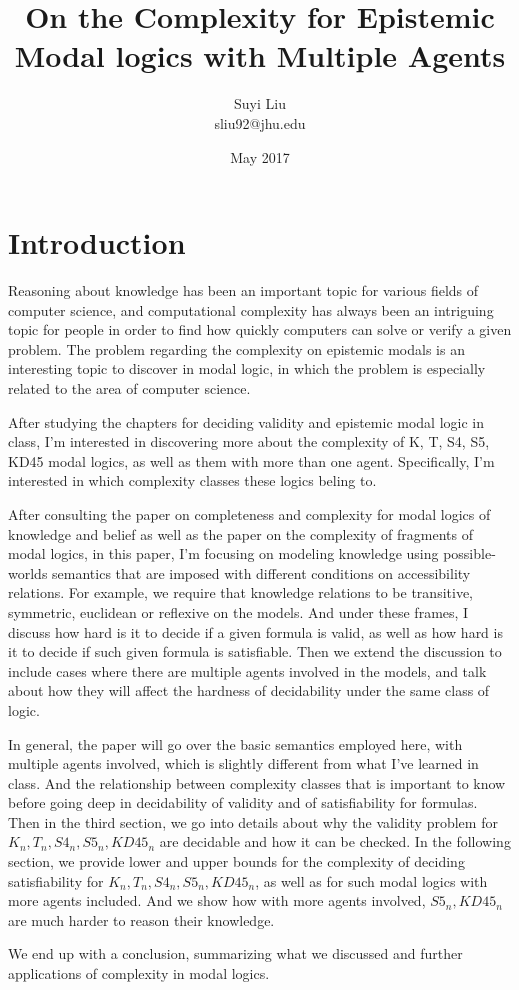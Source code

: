 \documentclass{article}
\title{On the Complexity for Epistemic Modal logics with Multiple Agents}
\author{Suyi Liu \\sliu92@jhu.edu}
\date{May 2017}
\begin{document}
\maketitle

\section{Introduction}
Reasoning about knowledge has been an important topic for various fields of computer science, and computational complexity has always been an intriguing topic for people in order to find how quickly computers can solve or verify a given problem. The problem regarding the complexity on epistemic modals is an interesting topic to discover in modal logic, in which the problem is especially related to the area of computer science.
\par After studying the chapters for deciding validity and epistemic modal logic in class, I'm interested in discovering more about the complexity of K, T, S4, S5, KD45 modal logics, as well as them with more than one agent. Specifically, I'm interested in which complexity classes these logics beling to. \par After consulting the paper on completeness and complexity for modal logics of knowledge and belief as well as the paper on the complexity of fragments of modal logics, in this paper, I'm focusing on modeling knowledge using possible-worlds semantics that are imposed with different conditions on accessibility relations. For example, we require that knowledge relations to be transitive, symmetric, euclidean or reflexive on the models. And under these frames, I discuss how hard is it to decide if a given formula is valid, as well as how hard is it to decide if such given formula is satisfiable. Then we extend the discussion to include cases where there are multiple agents involved in the models, and talk about how they will affect the hardness of decidability under the same class of logic.
\par In general, the paper will go over the basic semantics employed here, with multiple agents involved, which is slightly different from what I've learned in class. And the relationship between complexity classes that is important to know before going deep in decidability of validity and of satisfiability for formulas. Then in the third section, we go into details about why the validity problem for $K_n, T_n, S4_n, S5_n, KD45_n$ are decidable and how it can be checked. In the following section, we provide lower and upper bounds for the complexity of deciding satisfiability for $K_n, T_n, S4_n, S5_n, KD45_n$, as well as for such modal logics with more agents included. And we show how with more agents involved, $S5_n, KD45_n$ are much harder to reason their knowledge.
\par We end up with a conclusion, summarizing what we discussed and further applications of complexity in modal logics.
\end{document}
